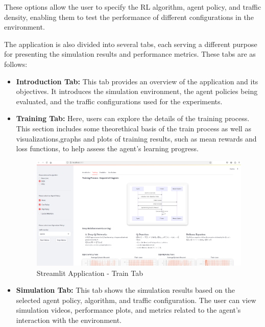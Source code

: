 These options allow the user to specify the RL algorithm, agent policy, and traffic density, enabling them to test the performance of different configurations in the environment.

The application is also divided into several tabs, each serving a different purpose for presenting the simulation results and performance metrics. 
These tabs are as follows:

\begin{itemize}
    \item \textbf{Introduction Tab:} 
    This tab provides an overview of the application and its objectives. It introduces the simulation environment, the agent policies being evaluated, and the traffic configurations used for the experiments.
    
    \item \textbf{Training Tab:} 
    Here, users can explore the details of the training process. This section includes some theorethical basis of the train process as well as visualizations,graphs and plots of training results, such as mean rewards and loss functions, to help assess the agent's learning progress.
    
    \begin{figure}[H]
        \centering
        \includegraphics[height=0.35\textheight]{images/app_train.png} 
        \caption{Streamlit Application - Train Tab}
    \end{figure}
    

    \item \textbf{Simulation Tab:} 
    This tab shows the simulation results based on the selected agent policy, algorithm, and traffic configuration. The user can view simulation videos, performance plots, and metrics related to the agent's interaction with the environment.
    

\end{itemize}
